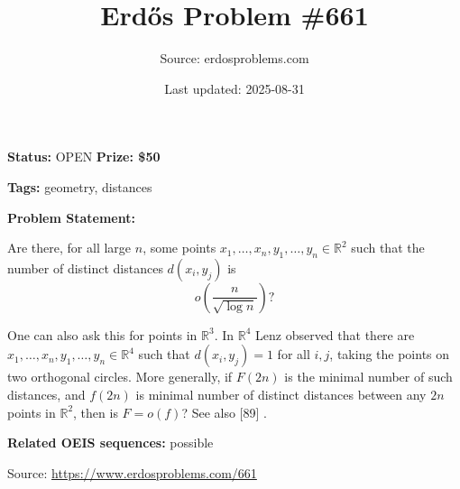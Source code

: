 \documentclass{article}
\title{Erd\H{o}s Problem \#661}
\date{Last updated: 2025-08-31}
\author{Source: erdosproblems.com}
\begin{document}
\maketitle

\noindent\textbf{Status:} OPEN \quad \textbf{Prize: \$50}

\noindent\textbf{Tags:} geometry, distances

\medskip

\noindent\textbf{Problem Statement:}

Are there, for all large $n$, some points $x_1,\ldots,x_n,y_1,\ldots,y_n\in \mathbb{R}^2$ such that the number of distinct distances $d(x_i,y_j)$ is\[o\left(\frac{n}{\sqrt{\log n}}\right)?\]




One can also ask this for points in $\mathbb{R}^3$. In $\mathbb{R}^4$ Lenz observed that there are $x_1,\ldots,x_n,y_1,\ldots,y_n\in \mathbb{R}^4$ such that $d(x_i,y_j)=1$ for all $i,j$, taking the points on two orthogonal circles. More generally, if $F(2n)$ is the minimal number of such distances, and $f(2n)$ is minimal number of distinct distances between any $2n$ points in $\mathbb{R}^2$, then is $F =o(f)$? See also [89] .

\noindent\textbf{Related OEIS sequences:} possible


\bigskip
\noindent\small{Source: \url{https://www.erdosproblems.com/661}}
\end{document}
